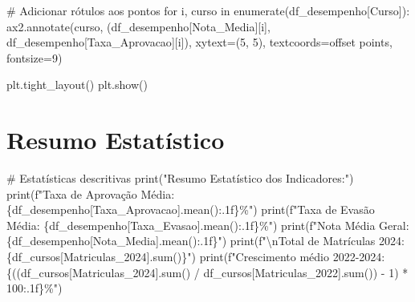 \documentclass[
  12pt,
  letterpaper,
]{report}
\newenvironment{Shaded}{\begin{snugshade}}{\end{snugshade}}
\newcommand{\BuiltInTok}[1]{\textcolor[rgb]{0.00,0.23,0.31}{#1}}
\newcommand{\CharTok}[1]{\textcolor[rgb]{0.13,0.47,0.30}{#1}}
\newcommand{\CommentTok}[1]{\textcolor[rgb]{0.37,0.37,0.37}{#1}}
\newcommand{\ControlFlowTok}[1]{\textcolor[rgb]{0.00,0.23,0.31}{#1}}
\newcommand{\DecValTok}[1]{\textcolor[rgb]{0.68,0.00,0.00}{#1}}
\newcommand{\KeywordTok}[1]{\textcolor[rgb]{0.00,0.23,0.31}{#1}}
\newcommand{\NormalTok}[1]{\textcolor[rgb]{0.00,0.23,0.31}{#1}}
\newcommand{\OperatorTok}[1]{\textcolor[rgb]{0.37,0.37,0.37}{#1}}
\newcommand{\SpecialCharTok}[1]{\textcolor[rgb]{0.37,0.37,0.37}{#1}}
\newcommand{\SpecialStringTok}[1]{\textcolor[rgb]{0.13,0.47,0.30}{#1}}
\newcommand{\StringTok}[1]{\textcolor[rgb]{0.13,0.47,0.30}{#1}}
\begin{document}
\begin{Shaded}
\begin{Highlighting}[]
\CommentTok{\# Adicionar rótulos aos pontos}
\ControlFlowTok{for}\NormalTok{ i, curso }\KeywordTok{in} \BuiltInTok{enumerate}\NormalTok{(df\_desempenho[}\StringTok{\textquotesingle{}Curso\textquotesingle{}}\NormalTok{]):}
\NormalTok{    ax2.annotate(curso, (df\_desempenho[}\StringTok{\textquotesingle{}Nota\_Media\textquotesingle{}}\NormalTok{][i], df\_desempenho[}\StringTok{\textquotesingle{}Taxa\_Aprovacao\textquotesingle{}}\NormalTok{][i]),}
\NormalTok{                xytext}\OperatorTok{=}\NormalTok{(}\DecValTok{5}\NormalTok{, }\DecValTok{5}\NormalTok{), textcoords}\OperatorTok{=}\StringTok{\textquotesingle{}offset points\textquotesingle{}}\NormalTok{, fontsize}\OperatorTok{=}\DecValTok{9}\NormalTok{)}

\NormalTok{plt.tight\_layout()}
\NormalTok{plt.show()}
\end{Highlighting}
\end{Shaded}

\section{Resumo Estatístico}\label{resumo-estatuxedstico}

\begin{Shaded}
\begin{Highlighting}[]
\CommentTok{\# Estatísticas descritivas}
\BuiltInTok{print}\NormalTok{(}\StringTok{"Resumo Estatístico dos Indicadores:"}\NormalTok{)}
\BuiltInTok{print}\NormalTok{(}\SpecialStringTok{f"Taxa de Aprovação Média: }\SpecialCharTok{\{}\NormalTok{df\_desempenho[}\StringTok{\textquotesingle{}Taxa\_Aprovacao\textquotesingle{}}\NormalTok{]}\SpecialCharTok{.}\NormalTok{mean()}\SpecialCharTok{:.1f\}}\SpecialStringTok{\%"}\NormalTok{)}
\BuiltInTok{print}\NormalTok{(}\SpecialStringTok{f"Taxa de Evasão Média: }\SpecialCharTok{\{}\NormalTok{df\_desempenho[}\StringTok{\textquotesingle{}Taxa\_Evasao\textquotesingle{}}\NormalTok{]}\SpecialCharTok{.}\NormalTok{mean()}\SpecialCharTok{:.1f\}}\SpecialStringTok{\%"}\NormalTok{)}
\BuiltInTok{print}\NormalTok{(}\SpecialStringTok{f"Nota Média Geral: }\SpecialCharTok{\{}\NormalTok{df\_desempenho[}\StringTok{\textquotesingle{}Nota\_Media\textquotesingle{}}\NormalTok{]}\SpecialCharTok{.}\NormalTok{mean()}\SpecialCharTok{:.1f\}}\SpecialStringTok{"}\NormalTok{)}
\BuiltInTok{print}\NormalTok{(}\SpecialStringTok{f"}\CharTok{\textbackslash{}n}\SpecialStringTok{Total de Matrículas 2024: }\SpecialCharTok{\{}\NormalTok{df\_cursos[}\StringTok{\textquotesingle{}Matriculas\_2024\textquotesingle{}}\NormalTok{]}\SpecialCharTok{.}\BuiltInTok{sum}\NormalTok{()}\SpecialCharTok{\}}\SpecialStringTok{"}\NormalTok{)}
\BuiltInTok{print}\NormalTok{(}\SpecialStringTok{f"Crescimento médio 2022{-}2024: }\SpecialCharTok{\{}\NormalTok{((df\_cursos[}\StringTok{\textquotesingle{}Matriculas\_2024\textquotesingle{}}\NormalTok{].}\BuiltInTok{sum}\NormalTok{() }\OperatorTok{/}\NormalTok{ df\_cursos[}\StringTok{\textquotesingle{}Matriculas\_2022\textquotesingle{}}\NormalTok{].}\BuiltInTok{sum}\NormalTok{()) }\OperatorTok{{-}} \DecValTok{1}\NormalTok{) }\OperatorTok{*} \DecValTok{100}\SpecialCharTok{:.1f\}}\SpecialStringTok{\%"}\NormalTok{)}
\end{Highlighting}
\end{Shaded}
\end{document}

